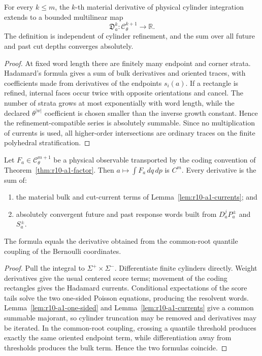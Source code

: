 \begin{lemma}
\label{lem:r10-a1-currents}
For every \(k\le m\), the \(k\)-th material derivative of physical cylinder
integration extends to a bounded multilinear map
\[
 \mathfrak D_a^k:
 \mathscr C_\theta^{k+1}\longrightarrow\mathbb R.
\]
The definition is independent of cylinder refinement, and the sum over all
future and past cut depths converges absolutely.
\end{lemma}

\begin{proof}
At fixed word length there are finitely many endpoint and corner strata.
Hadamard's formula gives a sum of bulk derivatives and oriented traces, with
coefficients made from derivatives of the endpoints \(s_i(a)\).  If a
rectangle is refined, internal faces occur twice with opposite orientations
and cancel.  The number of strata grows at most exponentially with word
length, while the declared \(\theta^{|w|}\) coefficient is chosen smaller than
the inverse growth constant.  Hence the refinement-compatible series is
absolutely summable.  Since no multiplication of currents is used, all
higher-order intersections are ordinary traces on the finite polyhedral
stratification.
\end{proof}

\begin{theorem}
\label{thm:r10-a1-response}
Let \(F_a\in\mathscr C_\theta^{m+1}\) be a physical observable transported by
the coding convention of Theorem~\ref{thm:r10-a1-factor}.  Then
\(a\mapsto\int F_a\,dq\,dp\) is \(C^m\).  Every derivative is the sum of:
\begin{enumerate}[label=(\roman*)]
\item the material bulk and cut-current terms of
      Lemma~\ref{lem:r10-a1-currents}; and
\item absolutely convergent future and past response words built from
      \(D_a^jP_a^\pm\) and \(S_a^\pm\).
\end{enumerate}
The formula equals the derivative obtained from the common-root quantile
coupling of the Bernoulli coordinates.
\end{theorem}

\begin{proof}
Pull the integral to \(\Sigma^+\times\Sigma^-\).  Differentiate finite
cylinders directly.  Weight derivatives give the usual centered score terms;
movement of the coding rectangles gives the Hadamard currents.  Conditional
expectations of the score tails solve the two one-sided Poisson equations,
producing the resolvent words.  Lemma~\ref{lem:r10-a1-one-sided} and
Lemma~\ref{lem:r10-a1-currents} give a common summable majorant, so cylinder
truncation may be removed and derivatives may be iterated.  In the common-root
coupling, crossing a quantile threshold produces exactly the same oriented
endpoint term, while differentiation away from thresholds produces the bulk
term.  Hence the two formulas coincide.
\end{proof}


